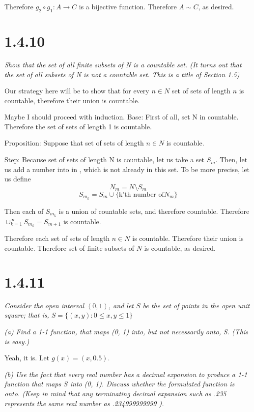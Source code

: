 \documentclass[11pt,oneside,titlepage]{book}
\begin{document}
Therefore $g_2 \circ g_1: A \to C$ is a bijective function. Therefore $A \sim C$, as desired.

\section*{1.4.10}
\textit{Show that the set of all finite subsets of N is a countable set. (It turns out that
  the set of all subsets of N is not a countable set. This is a title of Section 1.5)}

Our strategy here will be to show that for every $n \in N$ set of sets of
length $n$ is countable, therefore their union is countable.

Maybe I should proceed with induction.
Base: 
First of all, set N in countable.  Therefore the set of sets of length 1 is countable.

Proposition:
Suppose that set of sets of length $n \in N$ is countable.

Step:
Because set of sets of length N is countable, let us take a set $S_m$.
Then, let us add a number into in , which is not already in this set.
To be more precise, let us define
$$N_m = N \setminus S_m$$
$$S_{m_k} = S_m\cup \{\text{k'th number of}N_m\}$$

Then each of $S_{m_k}$ is a union of countable sets, and therefore countable.
Therefore $\cup^{\infty}_{k = 1} S_{m_k} = S_{m + 1}$ is countable.

Therefore each set of sets of length $n \in N$ is countable. Therefore their union is
countable. Therefore set of finite subsets of $N$ is countable, as desired.

\section*{1.4.11}
\textit{Consider the open interval $(0,1)$, and let $S$ be the set of points in the
  open unit square; that is, $S = \{(x, y): 0 \leq x,y \leq 1\}$}

\textit{(a) Find a 1-1 function, that maps (0, 1) into, but not necessarily onto, S.
  (This is easy.)}

Yeah, it is. Let $g(x) = (x, 0.5)$.

\textit{(b) Use the fact that every real number has a decimal expansion to produce a
  1-1 function that maps $S$ into (0, 1). Discuss whether the formulated function is onto.
  (Keep in mind that any terminating decimal expansion such as .235 represents the same
  real number as .234999999999 ).}
\end{document}
